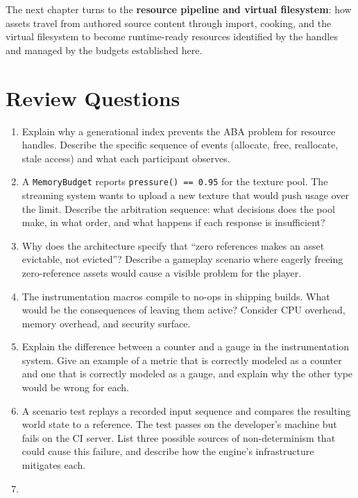 \documentclass[
  11pt,
  letterpaper,
  DIV=11,
  numbers=noendperiod,
  twoside,
  open=right]{scrreprt}
\begin{document}
The next chapter turns to the \textbf{resource pipeline and virtual
filesystem}: how assets travel from authored source content through
import, cooking, and the virtual filesystem to become runtime-ready
resources identified by the handles and managed by the budgets
established here.

\section*{Review Questions}\label{review-questions-5}


\begin{enumerate}
\def\labelenumi{\arabic{enumi}.}
\item
  Explain why a generational index prevents the ABA problem for resource
  handles. Describe the specific sequence of events (allocate, free,
  reallocate, stale access) and what each participant observes.
\item
  A \texttt{MemoryBudget} reports \texttt{pressure()\ ==\ 0.95} for the
  texture pool. The streaming system wants to upload a new texture that
  would push usage over the limit. Describe the arbitration sequence:
  what decisions does the pool make, in what order, and what happens if
  each response is insufficient?
\item
  Why does the architecture specify that ``zero references makes an
  asset evictable, not evicted''? Describe a gameplay scenario where
  eagerly freeing zero-reference assets would cause a visible problem
  for the player.
\item
  The instrumentation macros compile to no-ops in shipping builds. What
  would be the consequences of leaving them active? Consider CPU
  overhead, memory overhead, and security surface.
\item
  Explain the difference between a counter and a gauge in the
  instrumentation system. Give an example of a metric that is correctly
  modeled as a counter and one that is correctly modeled as a gauge, and
  explain why the other type would be wrong for each.
\item
  A scenario test replays a recorded input sequence and compares the
  resulting world state to a reference. The test passes on the
  developer's machine but fails on the CI server. List three possible
  sources of non-determinism that could cause this failure, and describe
  how the engine's infrastructure mitigates each.
\item

\end{enumerate}
\end{document}
